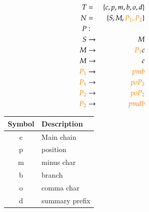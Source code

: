 \documentclass[
fontsize=11pt,
paper=a4,
abstract=true,
numbers=noenddot,
listof=totoc,
bibliography=totoc,
twoside,
open=right,
cleardoublepage=plain,
parskip=half+, %
BCOR=1cm, %
]{scrreprt}
\newcommand{\captionVSpace}{\vspace*{-0.05cm}}
\newcommand{\CFGDefinitionSize}{0.60}
\newcommand{\SymbolDescriptionTable}{0.35}
\newcommand{\colorNew}{orange}
\begin{document}
\begin{figure}[H]
    \begin{minipage}[l]{\CFGDefinitionSize\textwidth}
        $$
        \begin{aligned}
            T &=& \{c, p, m, b, o, d\} \\
            N &=& \{S, M, {\color{\colorNew}P_1, P_2}\} \\
            P &:& \\
            S &\rightarrow& M \\
            M &\rightarrow& {\color{\colorNew}P_1}c \\
            M &\rightarrow& c \\
            {\color{\colorNew}P_1} &\rightarrow& {\color{\colorNew}pmb} \\
            {\color{\colorNew}P_1} &\rightarrow& {\color{\colorNew}poP_2} \\
            {\color{\colorNew}P_2} &\rightarrow& {\color{\colorNew}poP_2} \\
            {\color{\colorNew}P_2} &\rightarrow& {\color{\colorNew}pmdb} \\
        \end{aligned}
        $$
        \caption{Adjusted CFG with $P_1$ and $P_2$.}
        \label{fig:CFGWithMultipleBranchesAtTheSameLengthNewApproach}
    \end{minipage}
    \begin{minipage}[r]{\SymbolDescriptionTable\textwidth}
        \begin{table}[H]
        \centering
            \begin{tabular}{c|l}
                \toprule
                \textbf{Symbol} & \textbf{Description} \\
                \midrule
                c & Main chain \\
                p & position \\
                m & minus char \\
                b & branch \\
                o & comma char \\
                d & summary prefix \\
                \bottomrule
            \end{tabular}
        \end{table}
    \end{minipage}
\end{figure}
\end{document}
